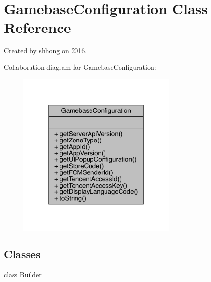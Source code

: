 \hypertarget{classcom_1_1toast_1_1android_1_1gamebase_1_1_gamebase_configuration}{}\section{Gamebase\+Configuration Class Reference}
\label{classcom_1_1toast_1_1android_1_1gamebase_1_1_gamebase_configuration}


Created by shhong on 2016.  




Collaboration diagram for Gamebase\+Configuration\+:\nopagebreak
\begin{figure}[H]
\begin{center}
\leavevmode
\includegraphics[width=226pt]{classcom_1_1toast_1_1android_1_1gamebase_1_1_gamebase_configuration__coll__graph}
\end{center}
\end{figure}
\subsection*{Classes}
\begin{DoxyCompactItemize}
\item 
class \hyperlink{classcom_1_1toast_1_1android_1_1gamebase_1_1_gamebase_configuration_1_1_builder}{Builder}
\end{DoxyCompactItemize}

